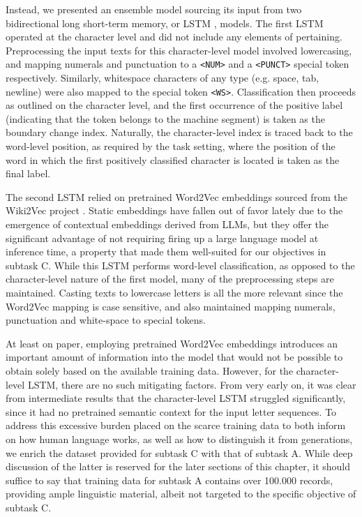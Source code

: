 Instead, we presented an ensemble model sourcing its input from two bidirectional long short-term memory, or LSTM \citep{hochreiter1997long}, models.
The first LSTM operated at the character level and did not include any elements of pertaining.
Preprocessing the input texts for this character-level model involved lowercasing, and mapping numerals and punctuation to a \verb|<NUM>| and a \verb|<PUNCT>| special token respectively.
Similarly, whitespace characters of any type (e.g. space, tab, newline) were also mapped to the special token \verb|<WS>|.
Classification then proceeds as outlined on the character level, and the first occurrence of the positive label (indicating that the token belongs to the machine segment) is taken as the boundary change index.
Naturally, the character-level index is traced back to the word-level position, as required by the task setting, where the position of the word in which the first positively classified character is located is taken as the final label.

The second LSTM relied on pretrained Word2Vec \citep{mikolov2013efficientestimationwordrepresentations} embeddings sourced from the Wiki2Vec project \citep{yamada2020wikipedia2vec}. Static embeddings have fallen out of favor lately due to the emergence of contextual embeddings derived from LLMs, but they offer the significant advantage of not requiring firing up a large language model at inference time, a property that made them well-suited for our objectives in subtask C.
While this LSTM performs word-level classification, as opposed to the character-level nature of the first model, many of the preprocessing steps are maintained.
Casting texts to lowercase letters is all the more relevant since the Word2Vec mapping is case sensitive, and also maintained mapping numerals, punctuation and white-space to special tokens.

At least on paper, employing pretrained Word2Vec embeddings introduces an important amount of information into the model that would not be possible to obtain solely based on the available training data.
However, for the character-level LSTM, there are no such mitigating factors.
From very early on, it was clear from intermediate results that the character-level LSTM struggled significantly, since it had no pretrained semantic context for the input letter sequences.
To address this excessive burden placed on the scarce training data to both inform on how human language works, as well as how to distinguish it from generations, we enrich the dataset provided for subtask C with that of subtask A.
While deep discussion of the latter is reserved for the later sections of this chapter, it should suffice to say that training data for subtask A contains over 100.000 records, providing ample linguistic material, albeit not targeted to the specific objective of subtask C.

